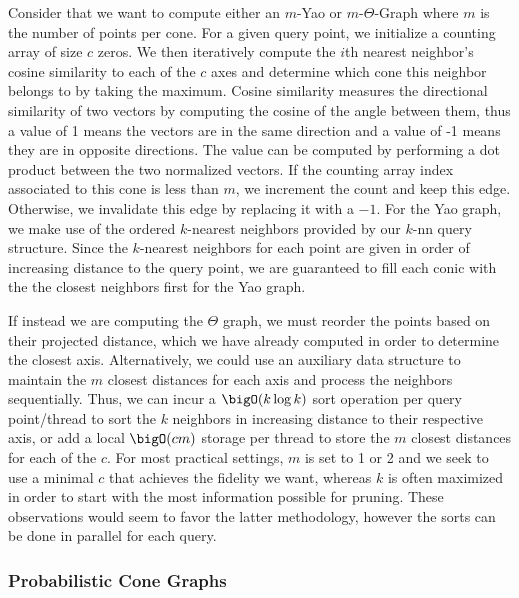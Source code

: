 Consider that we want to compute either an $m$-Yao or $m$-$\Theta$-Graph where $m$ is the number of points per cone.
%
For a given query point, we initialize a counting array of size $c$ zeros.
%
We then iteratively compute the $i$th nearest neighbor's cosine similarity to each of the $c$ axes and determine which cone this neighbor belongs to by taking the maximum.
%
Cosine similarity measures the directional similarity of two vectors by computing the cosine of the angle between them, thus a value of 1 means the vectors are in the same direction and a value of -1 means they are in opposite directions.
%
The value can be computed by performing a dot product between the two normalized vectors.
%
If the counting array index associated to this cone is less than $m$, we increment the count and keep this edge.
%
Otherwise, we invalidate this edge by replacing it with a $-1$.
%
For the Yao graph, we make use of the ordered $k$-nearest neighbors provided by our $k$-nn query structure.
%
Since the $k$-nearest neighbors for each point are given in order of increasing distance to the query point, we are guaranteed to fill each conic with the the closest neighbors first for the Yao graph.

If instead we are computing the $\Theta$ graph, we must reorder the points based on their projected distance, which we have already computed in order to determine the closest axis.
%
Alternatively, we could use an auxiliary data structure to maintain the $m$ closest distances for each axis and process the neighbors sequentially.
%
Thus, we can incur a $\bigO(k \log k)$ sort operation per query point/thread to sort the $k$ neighbors in increasing distance to their respective axis, or add a local $\bigO(cm)$ storage per thread to store the $m$ closest distances for each of the $c$.
%
For most practical settings, $m$ is set to 1 or 2 and we seek to use a minimal $c$ that achieves the fidelity we want, whereas $k$ is often maximized in order to start with the most information possible for pruning.
%
These observations would seem to favor the latter methodology, however the sorts can be done in parallel for each query.
%

\subsubsection{Probabilistic Cone Graphs}
\label{sec:probabilistic_cones}

